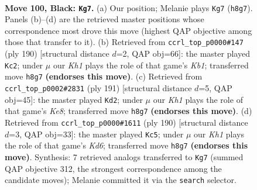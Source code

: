 \documentclass[11pt]{article}
\begin{document}
\clearpage

\begin{figure}[p]\centering
\begin{subfigure}{0.46\textwidth}\centering
\resizebox{\linewidth}{!}{%
\newchessgame
\chessboard[
  setfen={1R5k/8/8/8/8/7K/5p2/3r4 b - - 15 100},
  showmover=false,
  pgfstyle=straightmove, color=movearrow, markmove={h8-g7}
]}
\caption{}
\end{subfigure}\hfill
\begin{subfigure}{0.46\textwidth}\centering
\resizebox{\linewidth}{!}{%
\newchessgame
\chessboard[
  setfen={1k6/8/8/8/8/2R5/8/1K5r w - - 22 96},
  showmover=false,
  pgfstyle=straightmove, color=movearrow, markmove={b1-c2}
]}
\caption{}
\end{subfigure}
\\[4pt]
\begin{subfigure}{0.46\textwidth}\centering
\resizebox{\linewidth}{!}{%
\newchessgame
\chessboard[
  setfen={8/7r/8/8/4p3/4P3/6K1/R3k3 b - - 13 96},
  showmover=false,
  pgfstyle=straightmove, color=movearrow, markmove={e1-d2}
]}
\caption{}
\end{subfigure}\hfill
\begin{subfigure}{0.46\textwidth}\centering
\resizebox{\linewidth}{!}{%
\newchessgame
\chessboard[
  setfen={3k4/7R/3K2r1/8/3P4/8/8/8 w - - 19 96},
  showmover=false,
  pgfstyle=straightmove, color=movearrow, markmove={d6-c5}
]}
\caption{}
\end{subfigure}
\caption{\textbf{Move 100, Black: \texttt{Kg7}.} (a) Our position; Melanie plays \texttt{Kg7} (\texttt{h8g7}). Panels (b)--(d) are the retrieved master positions whose correspondence most drove this move (highest QAP objective among those that transfer to it). (b) Retrieved from \texttt{ccrl\_top\_p0000\#147} (ply 190) [structural distance $d$=2, QAP obj=66]: the master played \texttt{Kc2}; under $\mu$ our \emph{Kh1} plays the role of that game's \emph{Kb1}; transferred move \texttt{h8g7} \textbf{(endorses this move)}. (c) Retrieved from \texttt{ccrl\_top\_p0002\#2831} (ply 191) [structural distance $d$=5, QAP obj=45]: the master played \texttt{Kd2}; under $\mu$ our \emph{Kh1} plays the role of that game's \emph{Ke8}; transferred move \texttt{h8g7} \textbf{(endorses this move)}. (d) Retrieved from \texttt{ccrl\_top\_p0000\#1611} (ply 190) [structural distance $d$=3, QAP obj=33]: the master played \texttt{Kc5}; under $\mu$ our \emph{Kh1} plays the role of that game's \emph{Kd6}; transferred move \texttt{h8g7} \textbf{(endorses this move)}. Synthesis: 7 retrieved analogs transferred to \texttt{Kg7} (summed QAP objective 312, the strongest correspondence among the candidate moves); Melanie committed it via the \texttt{search} selector.}
\label{fig:thought-m199}
\end{figure}
\end{document}

